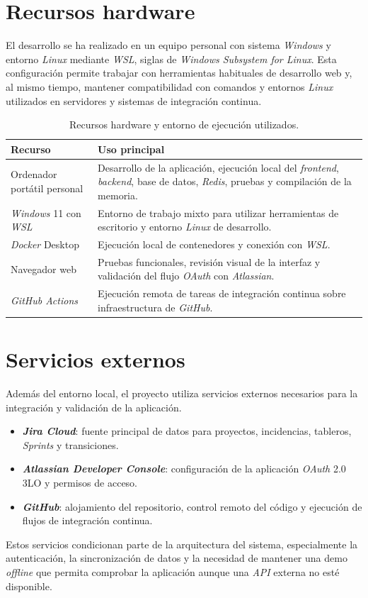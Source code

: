 \section{Recursos hardware}

El desarrollo se ha realizado en un equipo personal con sistema \textit{Windows} y entorno \textit{Linux} mediante \textit{WSL}, siglas de \textit{Windows Subsystem for Linux}. Esta configuración permite trabajar con herramientas habituales de desarrollo web y, al mismo tiempo, mantener compatibilidad con comandos y entornos \textit{Linux} utilizados en servidores y sistemas de integración continua.

\begin{table}[htbp]
\centering
\small
\begin{tabularx}{\textwidth}{p{} X}
\toprule
\textbf{Recurso} & \textbf{Uso principal} \\
\midrule
Ordenador portátil personal & Desarrollo de la aplicación, ejecución local del \textit{frontend}, \textit{backend}, base de datos, \textit{Redis}, pruebas y compilación de la memoria. \\
\midrule
\textit{Windows} 11 con \textit{WSL} & Entorno de trabajo mixto para utilizar herramientas de escritorio y entorno \textit{Linux} de desarrollo. \\
\midrule
\textit{Docker} Desktop & Ejecución local de contenedores y conexión con \textit{WSL}. \\
\midrule
Navegador web & Pruebas funcionales, revisión visual de la interfaz y validación del flujo \textit{OAuth} con \textit{Atlassian}. \\
\midrule
\textit{GitHub Actions} & Ejecución remota de tareas de integración continua sobre infraestructura de \textit{GitHub}. \\
\bottomrule
\end{tabularx}
\caption{Recursos hardware y entorno de ejecución utilizados.}
\label{tab:recursosHardware}
\end{table}

\section{Servicios externos}

Además del entorno local, el proyecto utiliza servicios externos necesarios para la integración y validación de la aplicación.

\begin{itemize}
    \item \textbf{\textit{Jira Cloud}}: fuente principal de datos para proyectos, incidencias, tableros, \textit{Sprints} y transiciones.
    \item \textbf{\textit{Atlassian Developer Console}}: configuración de la aplicación \textit{OAuth} 2.0 3LO y permisos de acceso.
    \item \textbf{\textit{GitHub}}: alojamiento del repositorio, control remoto del código y ejecución de flujos de integración continua.
\end{itemize}

Estos servicios condicionan parte de la arquitectura del sistema, especialmente la autenticación, la sincronización de datos y la necesidad de mantener una demo \textit{offline} que permita comprobar la aplicación aunque una \textit{API} externa no esté disponible.
